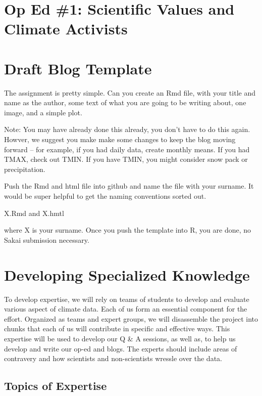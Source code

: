 \documentclass{article}\usepackage[]{graphicx}\usepackage[]{color}
\begin{document}
\section{Op Ed \#1: Scientific Values and Climate Activists}



\section{Draft Blog Template}

The assignment is pretty simple. Can you create an Rmd file, with your title and name as the author, some text of what you are going to be writing about, one image, and a simple plot. {\color{red}Note: You may have already done this already, you don't have to do this again. Howver, we suggest you make make some changes to keep the blog moving forward -- for example, if you had daily data, create monthly means. If you had TMAX, check out TMIN. If you have TMIN, you might consider snow pack or precipitation.  

Push the Rmd and html file into github and name the file with your surname. It would be super helpful to get the naming conventions sorted out.}

\begin{center}
X.Rmd and X.hmtl
\end{center}

\noindent where X is your surname. {\color{red} Once you push the template into R, you are done, no Sakai submission necessary.}

\section{Developing Specialized Knowledge}

To develop expertise, we will rely on teams of students to develop and evaluate various aspect of climate data. Each of us form an essential component for the effort. Organized as teams and expert groups, we will disassemble the project into chunks that each of us will contribute in specific and effective ways. This expertise will be used to develop our Q \& A sessions, as well as, to help us develop and write our op-ed and blogs. The experts should include areas of contravery and how scientists and non-scientists wressle over the data.

\subsection{Topics of Expertise}
\end{document}
